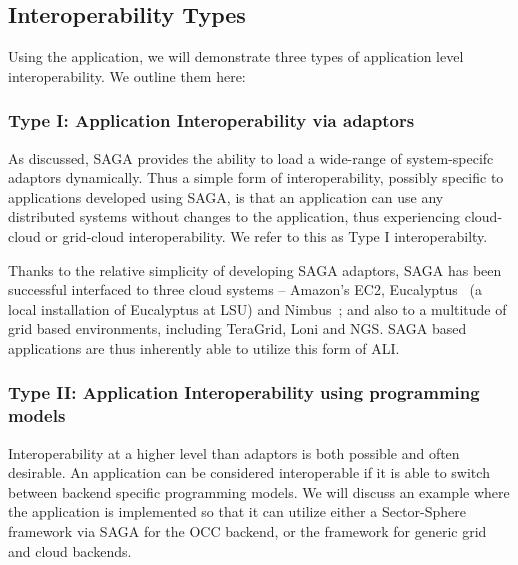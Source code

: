 \documentclass[3p,twocolumn]{elsarticle}
\begin{document}
\subsection{Interoperability Types}

Using the \wc application, we will demonstrate three types of
application level interoperability. We outline them here:


\subsubsection{Type I: Application Interoperability via adaptors}
%
%

As discussed, SAGA provides the ability to load a wide-range of
system-specifc adaptors dynamically. Thus a simple form of
interoperability, possibly specific to applications developed using
SAGA, is that an application can use any distributed systems without
changes to the application, thus experiencing cloud-cloud or
grid-cloud interoperability.  We refer to this as Type I
interoperabilty.


Thanks to the relative simplicity of developing SAGA adaptors, SAGA
has been successful interfaced to three cloud systems -- Amazon's EC2,
Eucalyptus~\cite{eucalyptus} (a local installation of Eucalyptus at
LSU) and Nimbus~\cite{nimbus}; and also to a multitude of grid based
environments, including TeraGrid, Loni and NGS.  SAGA based
applications are thus inherently able to utilize this form of ALI.

\subsubsection{Type II: Application Interoperability using programming
  models} %
%
%

Interoperability at a higher level than adaptors is both possible and
often desirable. An application can be considered interoperable if it
is able to switch between backend specific programming models.  We
will discuss an example where the \wc application is implemented so
that it can utilize either a Sector-Sphere framework via SAGA for the
OCC backend, or the \smr framework for generic grid and cloud
backends.
\end{document}
